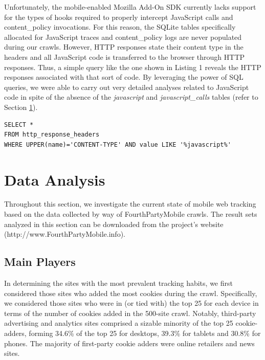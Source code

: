 \documentclass{acm_proc_article-sp}
\begin{document}
Unfortunately, the mobile-enabled Mozilla Add-On SDK currently lacks support for the types of hooks required to properly intercept JavaScript calls and content\_policy invocations. For this reason, the SQLite tables specifically allocated for JavaScript traces and content\_policy logs are never populated during our crawls. However, HTTP responses state their content type in the headers and all JavaScript code is transferred to the browser through HTTP responses. Thus, a simple query like the one shown in Listing 1 reveals the HTTP responses associated with that sort of code. By leveraging the power of SQL queries, we were able to carry out very detailed analyses related to JavaScript code in spite of the absence of the \emph{javascript} and \emph{javascript\_calls} tables (refer to Section \ref{sec:analysis}).

\noindent\begin{minipage}{1.0\linewidth}\centering
\begin{lstlisting}[caption=Example JavaScript analysis based on HTTP Responses]
SELECT *
FROM http_response_headers
WHERE UPPER(name)='CONTENT-TYPE' AND value LIKE '%javascript%'
\end{lstlisting}
\end{minipage}

\section{Data Analysis}
\label{sec:analysis}

Throughout this section, we investigate the current state of mobile web tracking based on the data collected by way of FourthPartyMobile crawls. The result sets analyzed in this section can be downloaded from the project's website (http://www.FourthPartyMobile.info).

\subsection{Main Players}

In determining the sites with the most prevalent tracking habits, we first considered those sites who added the most cookies during the crawl. Specifically, we considered those sites who were in (or tied with) the top 25 for each device in terms of the number of cookies added in the 500-site crawl. Notably, third-party advertising and analytics sites comprised a sizable minority of the top 25 cookie-adders, forming 34.6\% of the top 25 for desktops, 39.3\% for tablets and 30.8\% for phones. The majority of first-party cookie adders were online retailers and news sites.
\end{document}
